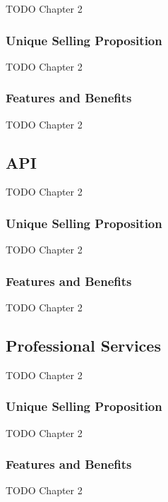 TODO Chapter 2

\subsubsection*{Unique Selling Proposition}

TODO Chapter 2

\subsubsection*{Features and Benefits}

TODO Chapter 2


\subsection{API}

TODO Chapter 2

\subsubsection*{Unique Selling Proposition}

TODO Chapter 2

\subsubsection*{Features and Benefits}

TODO Chapter 2


\subsection{Professional Services}

TODO Chapter 2

\subsubsection*{Unique Selling Proposition}

TODO Chapter 2

\subsubsection*{Features and Benefits}

TODO Chapter 2

